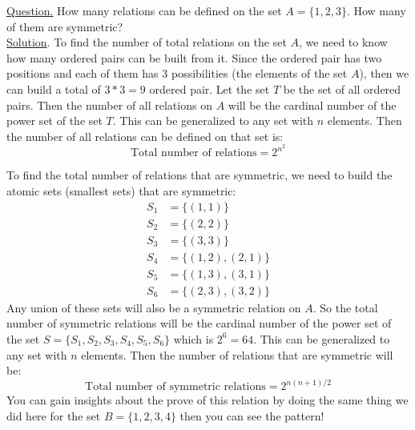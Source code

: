 \begin{example}
	\underline{Question.} How many relations can be defined on the set $ A = \{ 1,2,3 \} $. How many of them are symmetric? \\
	
	\underline{Solution}. To find the number of total relations on the set $ A $, we need to know how many ordered pairs can be built from it. Since the ordered pair has two positions and each of them has $ 3 $ possibilities (the elements of the set $ A $), then we can build a total of $ 3*3 = 9 $ ordered pair. Let the set $ T $ be the set of all ordered pairs. Then the number of all relations on $ A $ will be the cardinal number of the power set of the set $ T $. This can be generalized to any set with $ n $ elements. Then the number of all relations can be defined on that set is:
	\[ \text{Total number of relations} = 2^{n^2}\]
	
	To find the total number of relations that are symmetric, we need to build the atomic sets (smallest sets) that are symmetric:
	\begin{align*}
		S_1 &= \{ (1,1) \} \\
		S_2 &= \{ (2,2) \} \\
		S_3 &= \{ (3,3) \} \\
		S_4 &= \{ (1,2), (2,1) \} \\
		S_5 &= \{ (1,3), (3,1) \} \\
		S_6 &= \{ (2,3), (3,2) \} 
	\end{align*}
	Any union of these sets will also be a symmetric relation on $ A $. So the total number of symmetric relations will be the cardinal number of the power set of the set $ S=\{S_1, S_2, S_3, S_4, S_5, S_6\} $ which is $ 2^6 = 64 $. This can be generalized to any set with $ n $ elements. Then the number of relations that are symmetric will be:
	\[\text{Total number of symmetric relations} = 2^{n(n+1)/2}\]
	You can gain insights about the prove of this relation by doing the same thing we did here for the set $  B = \{ 1,2,3,4 \} $ then you can see the pattern!
	
\end{example}



